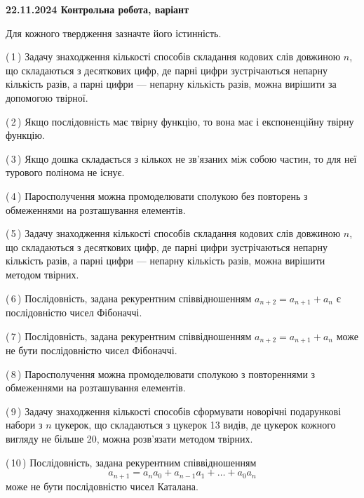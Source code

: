 \documentclass[12pt, ukrainian]{article}
\begin{document}
\begin {large}
\begin {large}
\begin {large}
\begin {large}
\begin {large}
\begin {large}
\begin {large}
\begin {large}
\begin {large}
\textbf{22.11.2024 Контрольна робота, варіант  }\par


{
Для кожного твердження зазначте його істинність.\par

\vspace{2mm}

(\,1\,) Задачу знаходження кількості способів складання кодових слів довжиною $n$, що складаються з десяткових цифр, де парні цифри зустрічаються непарну кількість разів, а парні цифри — непарну кількість разів, можна вирішити за допомогою твірної.%



(\,2\,) Якщо послідовність має твірну функцію, то вона має і експоненційну твірну функцію.%



(\,3\,) Якщо дошка складається з кількох не зв’язаних між собою частин, то для неї турового полінома не існує.%



(\,4\,) Паросполучення можна промоделювати сполукою без повторень з обмеженнями на розташування елементів.%



(\,5\,) Задачу знаходження кількості способів складання кодових слів довжиною $n$, що складаються з десяткових цифр, де парні цифри зустрічаються непарну кількість разів, а парні цифри — непарну кількість разів, можна вирішити методом твірних.%



(\,6\,) Послідовність, задана рекурентним співвідношенням $a_{n+2}=a_{n+1}+a_{n}$ є послідовністю чисел Фібоначчі.%



(\,7\,) Послідовність, задана рекурентним співвідношенням $a_{n+2}=a_{n+1}+a_{n}$ може не бути послідовністю чисел Фібоначчі.%



(\,8\,) Паросполучення можна промоделювати сполукою з повтореннями з обмеженнями на розташування елементів.%



(\,9\,) Задачу знаходження кількості способів сформувати новорічні подарункові набори з $n$ цукерок, що складаються з цукерок 13 видів, де цукерок кожного вигляду не більше 20, можна розв’язати методом твірних.%



(\,10\,) Послідовність, задана рекурентним співвідношенням $$a_{n+1}=a_{n}a_{0}+a_{n-1}a_{1}+\ldots+a_0a_{n}$$ може не бути послідовністю чисел Каталана.%




}
\end{large}
\end{large}
\end{large}
\end{large}
\end{large}
\end{large}
\end{large}
\end{large}
\end{large}
\end{document}
